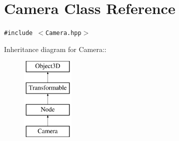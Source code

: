 \hypertarget{classm3g_1_1Camera}{
\section{Camera Class Reference}
\label{classm3g_1_1Camera}
}
{\tt \#include $<$Camera.hpp$>$}

Inheritance diagram for Camera::\begin{figure}[H]
\begin{center}
\leavevmode
\includegraphics[height=4cm]{classm3g_1_1Camera}
\end{center}
\end{figure}
